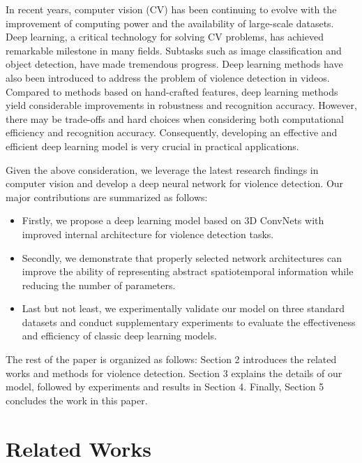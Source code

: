 \documentclass[10pt,twocolumn,letterpaper]{article}
\begin{document}
In recent years, computer vision (CV) has been continuing to evolve with the improvement of computing power and the availability of large-scale datasets.
Deep learning, a critical technology for solving CV problems, has achieved remarkable milestone in many fields.
Subtasks such as image classification and object detection, have made tremendous progress.
Deep learning methods have also been introduced to address the problem of violence detection in videos.
Compared to methods based on hand-crafted features, deep learning methods yield considerable improvements in robustness and recognition accuracy.
However, there may be trade-offs and hard choices when considering both computational efficiency and recognition accuracy.
Consequently, developing an effective and efficient deep learning model is very crucial in practical applications.

Given the above consideration, we leverage the latest research findings in computer vision and develop a deep neural network for violence detection. Our major contributions are summarized as follows:
\begin{itemize}
	\item Firstly, we propose a deep learning model based on 3D ConvNets with improved internal architecture for violence detection tasks.
	\item Secondly, we demonstrate that properly selected network architectures can improve the ability of  representing abstract spatiotemporal information while reducing the number of parameters.
	\item Last but not least, we experimentally validate our model on three standard datasets and conduct supplementary experiments to evaluate the effectiveness and efficiency of classic deep learning models.
	
\end{itemize}

The rest of the paper is organized as follows: Section 2 introduces the related works and methods for violence detection. Section 3 explains the details of our model, followed by experiments and results in Section 4. Finally, Section 5 concludes the work in this paper.


\section{Related Works}
\end{document}
